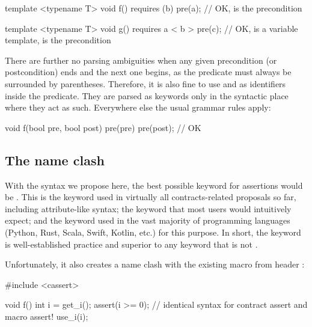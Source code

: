 \begin{codeblock}
template <typename T>
void f() requires (b) pre(a);   // OK,  is the precondition

template <typename T>
void g() requires a < b > pre(c);   // OK,  is a variable template,  is the precondition
\end{codeblock}

There are further no parsing ambiguities when any given precondition (or postcondition) ends and the next one begins, as the predicate must always be surrounded by parentheses. Therefore, it is also fine to use  and  as identifiers inside the predicate. They are parsed as keywords only in the syntactic place where they act as such. Everywhere else the usual grammar rules apply:

\begin{codeblock}
void f(bool pre, bool post)
  pre(pre) pre(post);   // OK
\end{codeblock}


\subsection{The  name clash}
\label{subsec:assrt}

With the syntax we propose here, the best possible keyword for assertions would be . This is the keyword used in virtually all contracts-related proposals so far, including attribute-like syntax; the keyword that most users would intuitively expect; and the keyword used in the vast majority of programming languages (Python, Rust, Scala, Swift, Kotlin, etc.) for this purpose. In short, the keyword  is well-established practice and superior to any keyword that is not .

Unfortunately, it also creates a name clash with the existing  macro from header :

\begin{codeblock}
#include <cassert> 

void f() {
  int i = get_i();
  assert(i >= 0);  // identical syntax for contract assert and macro assert!
  use_i(i);
}
\end{codeblock}

